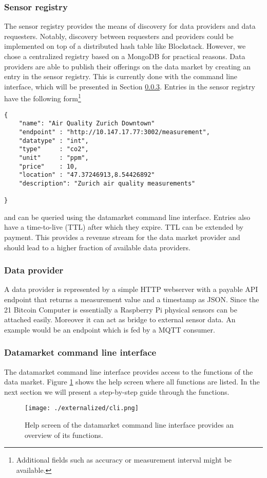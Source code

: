 \subsubsection{Sensor registry}
\label{sec:registry}
The sensor registry provides the means of discovery for data providers and data requesters. Notably, discovery between requesters and providers could be implemented on top of a distributed hash table like Blockstack\cite{blockstack}. However, we chose a centralized registry based on a MongoDB for practical reasons. Data providers are able to publish their offerings on the data market by creating an entry in the sensor registry. This is currently done with the command line interface, which will be presented in Section \ref{sec:cli}. Entries in the sensor registry have the following form\footnote{Additional fields such as accuracy or measurement interval might be available.}
\begin{lstlisting}[basicstyle=\ttfamily\tiny]
{     
    "name": "Air Quality Zurich Downtown"
    "endpoint" : "http://10.147.17.77:3002/measurement",
    "datatype" : "int",
    "type"     : "co2",
    "unit"     : "ppm",
    "price"    : 10,
    "location" : "47.37246913,8.54426892"
    "description": "Zurich air quality measurements"

}
\end{lstlisting}
and can be queried using the datamarket command line interface. Entries also have a time-to-live (TTL) after which they expire. TTL can be extended by payment. This provides a revenue stream for the data market provider and should lead to a higher fraction of available data providers. 
\subsubsection{Data provider}
A data provider is represented by a simple HTTP webserver with a payable API endpoint that returns a measurement value and a timestamp as JSON. Since the 21 Bitcoin Computer is essentially a Raspberry Pi physical sensors can be attached easily. Moreover it can act as bridge to external sensor data. An example would be an endpoint which is fed by a MQTT consumer.
\subsubsection{Datamarket command line interface}
\label{sec:cli}
The datamarket command line interface provides access to the functions of the data market. Figure \ref{fig:cli} shows the help screen where all functions are listed. In the next section we will present a step-by-step guide through the functions.
\begin{figure}
\begin{center}
\texttt{[image: ./externalized/cli.png]}
\caption{Help screen of the datamarket command line interface provides an overview of its functions.}
\label{fig:cli}
\end{center}
\end{figure}
